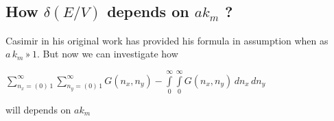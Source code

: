 \documentclass[twoside, 10pt]{article}
\begin{document}
\begin{multicols}{2}


    \section*{\centering\texorpdfstring{How \(\delta\left(E/V\right)\) depends on
\(a k_m\)
?}{How \textbackslash{}delta\textbackslash{}left(E/V\textbackslash{}right) depends on a k\_m ?}}\label{how-deltaleftevright-depends-on-a-k_m}
\vspace{-3.5mm}


    Casimir in his original work has provided his formula in assumption when
as \(a\,k_m\,»\,1\). But now we can investigate how

\(\sum\limits_{n_x=\left(0\right)\,1}^{\infty} \sum\limits_{n_y=\left(0\right)\,1}^{\infty} G\left(n_x, n_y\right) - \int\limits_{0}^{\infty} \int\limits_{0}^{\infty} G\left(n_x, n_y\right)\,d{n_x}\,d{n_y}\)

will depends on \(a k_m\)


\end{multicols}
\end{document}
